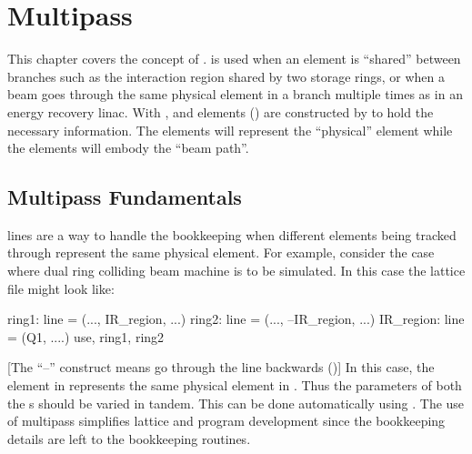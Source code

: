 \chapter{Multipass}
\label{c:multipass}

This chapter covers the concept of .  is used when an element is
``shared'' between branches such as the interaction region shared by two storage rings, or when a
beam goes through the same physical element in a branch multiple times as in an energy recovery
linac. With ,  and  elements () are constructed
by \bmad to hold the necessary information. The  elements will represent the ``physical''
element while the  elements will embody the ``beam path''.

\section{Multipass Fundamentals}
\label{c:multipass.fund}

 lines are a way to handle the bookkeeping when different elements being tracked
through represent the same physical element. For example, consider the case where dual ring colliding
beam machine is to be simulated. In this case the lattice file might look like:
\begin{example}
  ring1: line = (..., IR_region, ...)
  ring2: line = (..., --IR_region, ...)
  IR_region: line = (Q1, ....)
  use, ring1, ring2
\end{example}
[The ``--'' construct means go through the line backwards ()] In this case, the
 element in  represents the same physical element in . Thus the parameters
of both the s should be varied in tandem. This can be done automatically using .
The use of multipass simplifies lattice and program development since the bookkeeping details are left
to the \bmad bookkeeping routines.

